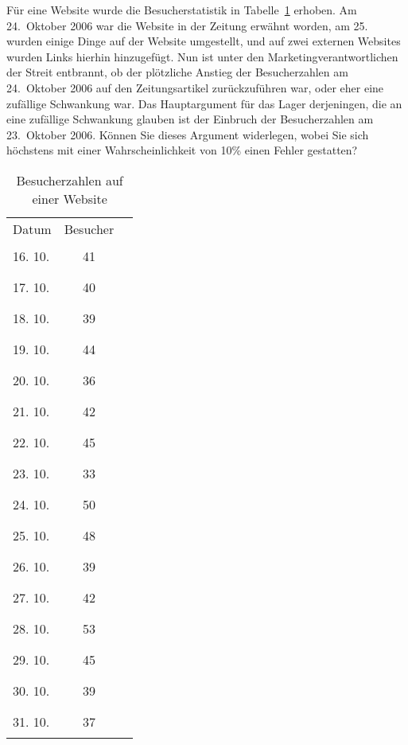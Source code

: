 Für eine Website wurde die Besucherstatistik
in Tabelle~\ref{80000011:besucher}
erhoben. Am 24.~Oktober 2006 war die Website in der Zeitung erwähnt worden,
am 25. wurden einige Dinge auf der Website umgestellt, und auf zwei externen
Websites wurden Links hierhin hinzugefügt.
Nun ist unter den Marketingverantwortlichen der Streit entbrannt,
ob der plötzliche Anstieg der Besucherzahlen am 24.~Oktober 2006
auf den Zeitungsartikel zurückzuführen war, oder eher eine zufällige
Schwankung war.
Das Hauptargument für das Lager derjeningen, die an eine zufällige Schwankung
glauben ist der Einbruch der Besucherzahlen am 23.~Oktober 2006.
Können Sie dieses Argument widerlegen, wobei Sie sich
höchstens mit einer Wahrscheinlichkeit von 10\% einen Fehler gestatten?

\begin{table}
\begin{center}
\begin{tabular}{lcl}
Datum&Besucher&\\
16. 10.&41&\rule{41mm}{5pt}\\
17. 10.&40&\rule{40mm}{5pt}\\
18. 10.&39&\rule{39mm}{5pt}\\
19. 10.&44&\rule{44mm}{5pt}\\
20. 10.&36&\rule{36mm}{5pt}\\
21. 10.&42&\rule{42mm}{5pt}\\
22. 10.&45&\rule{45mm}{5pt}\\
23. 10.&33&\rule{33mm}{5pt}\\
24. 10.&50&\rule{50mm}{5pt}\\
25. 10.&48&\rule{48mm}{5pt}\\
26. 10.&39&\rule{39mm}{5pt}\\
27. 10.&42&\rule{42mm}{5pt}\\
28. 10.&53&\rule{53mm}{5pt}\\
29. 10.&45&\rule{45mm}{5pt}\\
30. 10.&39&\rule{39mm}{5pt}\\
31. 10.&37&\rule{37mm}{5pt}\\
\end{tabular}
\end{center}
\caption{Besucherzahlen auf einer Website\label{80000011:besucher}}
\end{table}


